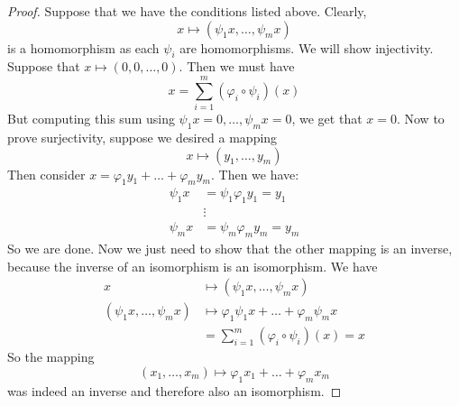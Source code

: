 \documentclass{article}
\begin{document}
    \begin{proof}
        Suppose that we have the conditions listed above. Clearly,
            \begin{equation*}
                x \mapsto (\psi_{1}x, \ldots, \psi_{m}x)
            \end{equation*}
        is a homomorphism as each $\psi_{i}$ are homomorphisms. We will show injectivity. Suppose that $x \mapsto (0, 0, \ldots, 0)$. Then we must have 
            \begin{equation*}
                x = \sum_{i = 1}^{m} (\varphi_{i} \circ \psi_{i})(x)
            \end{equation*}
        But computing this sum using $\psi_{1}x = 0, \ldots, \psi_{m}x = 0$, we get that $x = 0$. Now to prove surjectivity, suppose we desired a mapping
            \begin{equation*}
                x \mapsto (y_{1}, \ldots, y_{m})
            \end{equation*}
        Then consider $x = \varphi_{1}y_{1} + \ldots + \varphi_{m}y_{m}$. Then we have:
            \begin{align*}
                \psi_{1}x &=      \psi_{1}\varphi_{1}y_{1} = y_{1} \\
                          &\vdots                                  \\
                \psi_{m}x &=      \psi_{m}\varphi_{m}y_{m} = y_{m}   
            \end{align*}
        So we are done. Now we just need to show that the other mapping is an inverse, because the inverse of an isomorphism is an isomorphism. We have
            \begin{align*}
                x                              &\mapsto  (\psi_{1}x, \ldots, \psi_{m}x)                       \\
                (\psi_{1}x, \ldots, \psi_{m}x) &\mapsto  \varphi_{1}\psi_{1}x + \ldots + \varphi_{m}\psi_{m}x \\
                                               &=        \sum_{i = 1}^{m} (\varphi_{i} \circ \psi_{i})(x) = x   
            \end{align*}
        So the mapping
            \begin{equation*}
                (x_{1}, \ldots, x_{m}) \mapsto \varphi_{1}x_{1} + \ldots + \varphi_{m}x_{m}
            \end{equation*}
        was indeed an inverse and therefore also an isomorphism.
    \end{proof}
\end{document}

